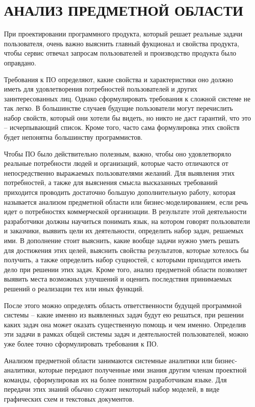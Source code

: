 \section{АНАЛИЗ ПРЕДМЕТНОЙ ОБЛАСТИ}
\label{sec:analysis}

При проектировании программного продукта, который решает реальные задачи пользователя, очень важно выяснить главный фукционал и свойства продукта, чтобы сервис отвечал запросам пользователей и производство продукта было оправдано.

Требования к ПО определяют, какие свойства и характеристики оно должно иметь для удовлетворения потребностей пользователей и других заинтересованных лиц. Однако сформулировать требования к сложной системе не так легко. В большинстве случаев будущие пользователи могут перечислить набор свойств, который они хотели бы видеть, но никто не даст гарантий, что это – исчерпывающий список. Кроме того, часто сама формулировка этих свойств будет непонятна большинству программистов.

Чтобы ПО было действительно полезным, важно, чтобы оно удовлетворяло реальные потребности людей и организаций, которые часто отличаются от непосредственно выражаемых пользователями желаний. Для выявления этих потребностей, а также для выяснения смысла высказанных требований приходится проводить достаточно большую дополнительную работу, которая называется анализом предметной области или бизнес-моделированием, если речь идет о потребностях коммерческой организации. В результате этой деятельности разработчики должны научиться понимать язык, на котором говорят пользователи и заказчики, выявить цели их деятельности, определить набор задач, решаемых ими. В дополнение стоит выяснить, какие вообще задачи нужно уметь решать для достижения этих целей, выяснить свойства результатов, которые хотелось бы получить, а также определить набор сущностей, с которыми приходится иметь дело при решении этих задач. Кроме того, анализ предметной области позволяет выявить места возможных улучшений и оценить последствия принимаемых решений о реализации тех или иных функций.

После этого можно определять область ответственности будущей программной системы – какие именно из выявленных задач будут ею решаться, при решении каких задач она может оказать существенную помощь и чем именно. Определив эти задачи в рамках общей системы задач и деятельностей пользователей, можно уже более точно сформулировать требования к ПО.

Анализом предметной области занимаются системные аналитики или бизнес-аналитики, которые передают полученные ими знания другим членам проектной команды, сформулировав их на более понятном разработчикам языке. Для передачи этих знаний обычно служит некоторый набор моделей, в виде графических схем и текстовых документов.

